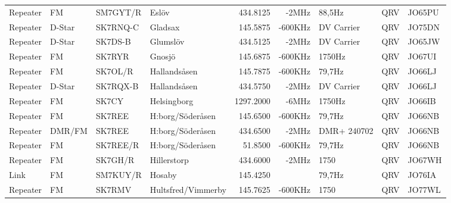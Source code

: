 \begin{landscape}
\begin{longtable}{llllrrlcl}
	Repeater          & FM           & SM7GYT/R      & Eslöv               &          434.8125 &          -2MHz & 88,5Hz          &       QRV       & JO65PU           \\
	Repeater          & D-Star       & SK7RNQ-C      & Gladsax             &          145.5875 &        -600KHz & DV Carrier      &       QRV       & JO75DN           \\
	Repeater          & D-Star       & SK7DS-B       & Glumslöv            &          434.5125 &          -2MHz & DV Carrier      &       QRV       & JO65JW           \\
	Repeater          & FM           & SK7RYR        & Gnosjö              &          145.6875 &        -600KHz & 1750Hz          &       QRV       & JO67UI           \\
	Repeater          & FM           & SK7OL/R       & Hallandsåsen        &          145.7875 &        -600KHz & 79,7Hz          &       QRV       & JO66LJ           \\
	Repeater          & D-Star       & SK7RQX-B      & Hallandsåsen        &          434.5750 &          -2MHz & DV Carrier      &       QRV       & JO66LJ           \\
	Repeater          & FM           & SK7CY         & Helsingborg         &         1297.2000 &          -6MHz & 1750Hz          &       QRV       & JO66IB           \\
	Repeater          & FM           & SK7REE        & H:borg/Söderåsen    &          145.6500 &        -600KHz & 79,7Hz          &       QRV       & JO66NB           \\
	Repeater          & DMR/FM       & SK7REE        & H:borg/Söderåsen    &          434.6500 &          -2MHz & DMR+ 240702     &       QRV       & JO66NB           \\
	Repeater          & FM           & SK7REE/R      & H:borg/Söderåsen    &           51.8500 &        -600KHz & 79,7Hz          &       QRV       & JO66NB           \\
	Repeater          & FM           & SK7GH/R       & Hillerstorp         &          434.6000 &          -2MHz & 1750            &       QRV       & JO67WH           \\
	Link              & FM           & SM7KUY/R      & Hosaby              &          145.4250 &                & 79,7Hz          &       QRV       & JO76IA           \\
	Repeater          & FM           & SK7RMV        & Hultsfred/Vimmerby  &          145.7625 &        -600KHz & 1750            &       QRV       & JO77WL           \\

\end{longtable}
\end{landscape}
